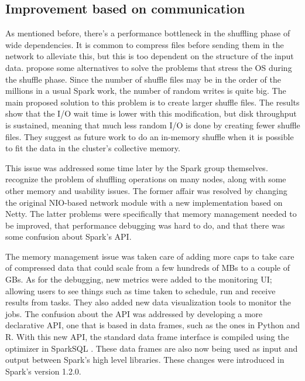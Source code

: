 \documentclass{article}
\begin{document}
\subsection{Improvement based on communication}

As mentioned before, there's a performance bottleneck in the shuffling phase of wide dependencies. It is common to compress files before sending them in the network to alleviate this, but this is too dependent on the structure of the input data. \citeauthor{davidson2013optimizing} \cite{davidson2013optimizing} propose some alternatives to solve the problems that stress the OS during the shuffle phase. Since the number of shuffle files may be in the order of the millions in a usual Spark work, the number of random writes is quite big. The main proposed solution to this problem is to create larger shuffle files. The results show that the I/O wait time is lower with this modification, but disk throughput is sustained, meaning that much less random I/O is done by creating fewer shuffle files. They suggest as future work to do an in-memory shuffle when it is possible to fit the data in the cluster's collective memory.

This issue was addressed some time later by the Spark group themselves. \citeauthor{Armbrust2015} \cite{Armbrust2015} recognize the problem of shuffling operations on many nodes, along with some other memory and usability issues. The former affair was resolved by changing the original NIO-based network module with a new implementation based on Netty. The latter problems were specifically that memory management needed to be improved, that performance debugging was hard to do, and that there was some confusion about Spark's API.

The memory management issue was taken care of adding more caps to take care of compressed data that could scale from a few hundreds of MBs to a couple of GBs. As for the debugging, new metrics were added to the monitoring UI; allowing users to see things such as time taken to schedule, run and receive results from tasks. They also added new data visualization tools to monitor the jobs. The confusion about the API was addressed by developing a more declarative API, one that is based in data frames, such as the ones in Python and R. With this new API, the standard data frame interface is compiled using the optimizer in SparkSQL \cite{armbrust2015spark}. These data frames are also now being used as input and output between Spark's high level libraries. These changes were introduced in Spark's version 1.2.0.
\end{document}
